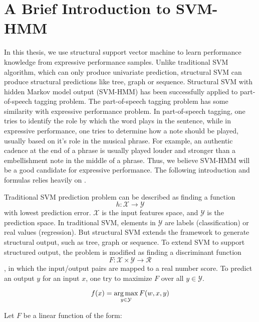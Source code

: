 \section{A Brief Introduction to SVM-HMM}
\label{sec:svm-hmm}
In this thesis, we use structural support vector machine to learn performance knowledge from expressive performance samples. Unlike traditional SVM algorithm, which can only produce univariate prediction, structural SVM can produce structural predictions like tree, graph or sequence. Structural SVM with hidden Markov model output (SVM-HMM) has been successfully applied to part-of-speech tagging problem\cite{svm2009}. The part-of-speech tagging problem has some similarity with expressive performance problem. In part-of-speech tagging, one tries to identify the role by which the word plays in the sentence, while in expressive performance, one tries to determine how a note should be played, usually based on it's role in the musical phrase. For example, an authentic cadence at the end of a phrase is usually played louder and stronger than a embellishment note in the middle of a phrase. Thus, we believe SVM-HMM will be a good candidate for expressive performance. The following introduction and formulas relies heavily on \cite{svm2009, svm2005, svm2003}.


Traditional SVM prediction problem can be described as finding a function 
$$h: \mathcal{X \rightarrow Y}$$ with lowest prediction error. $\mathcal{X}$ is the input features space, and $\mathcal{Y}$ is the prediction space. In traditional SVM, elements in $\mathcal{Y}$ are labels (classification) or real values (regression). But structural SVM extends the framework to generate structural output, such as tree, graph or sequence.
To extend SVM to support structured output, the problem is modified as finding a discriminant function $$F: \mathcal{X} \times \mathcal{Y} \rightarrow \mathcal{R}$$, in which the input/output pairs are mapped to a real number score. To predict an output $y$ for an input $x$, one try to maximize $F$ over all $y \in \mathcal{Y}$. 

$$f(x) = \operatorname*{arg\,max}_{y\in\mathcal{Y}} F(w,x,y)$$

Let $F$ be a linear function of the form:

